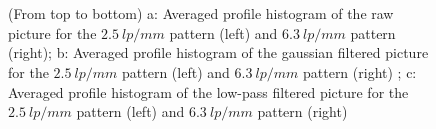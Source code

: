 \documentclass[a4paper]{article}
\begin{document}
\begin{figure}[h]
	\centering
  \\
  \\
	\caption{(From top to bottom) a: Averaged profile histogram of the raw picture for the $2.5\ lp/mm$ pattern (left) and $6.3\ lp/mm$ pattern (right); b: Averaged profile histogram of the gaussian filtered picture for the $2.5\ lp/mm$ pattern (left) and $6.3\ lp/mm$ pattern (right)  ; c: Averaged profile histogram of the low-pass filtered picture for the $2.5\ lp/mm$ pattern (left) and $6.3\ lp/mm$ pattern (right)}
  \label{fig:ex_two_pro}
\end{figure}
\end{document}
